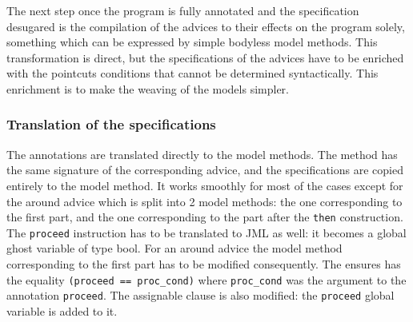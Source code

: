 The next step once the program is fully annotated and the
specification desugared is the compilation of the advices to their
effects on the program solely, something which can be expressed by
simple bodyless model methods.  This transformation is direct, but the
specifications of the advices have to be enriched with the pointcuts
conditions that cannot be determined syntactically.  This enrichment
is to make the weaving of the models simpler.

\subsubsection{Translation of the specifications}
The annotations are translated directly to the model methods. The
method has the same signature of the corresponding advice, and the
specifications are copied entirely to the model method. It works
smoothly for most of the cases except for the around advice which is
split into 2 model methods: the one corresponding to the first part,
and the one corresponding to the part after the {\tt then}
construction.  The {\tt proceed} instruction has to be translated to
 JML as well: it becomes a global ghost variable of type bool.  For an
 around advice the model method corresponding to the first part has to
 be modified consequently.  The ensures has the equality {\tt (proceed
 == proc\_cond)} where {\tt proc\_cond} was the argument to the
 annotation {\tt proceed}. The assignable clause is also modified: the
 {\tt proceed} global variable is added to it.
